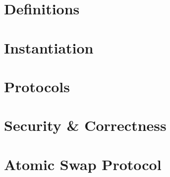 \section{Definitions}\label{sec:atom:definitions}


\section{Instantiation}\label{sec:atom:inst}


\section{Protocols}\label{sec:atom:protocols}


\section{Security \& Correctness} \label{sec:atom:security}


\section{Atomic Swap Protocol}\label{sec:atom:atomic-swap}
